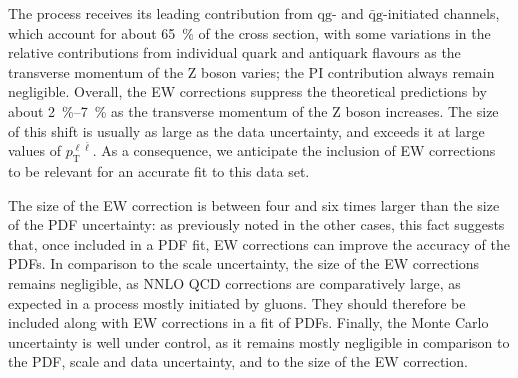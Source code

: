 The process receives its leading contribution from $\mathrm{qg}$- and
$\bar{\mathrm{q}}\mathrm{g}$-initiated channels, which account for about \SI{65}{\percent}
of the cross section, with some variations in the relative contributions from
individual quark and antiquark flavours as the transverse momentum of the
Z boson varies; the PI contribution always remain negligible.
Overall, the EW corrections suppress the theoretical predictions by about
\SIrange{2}{7}{\percent} as the transverse momentum of the Z boson increases.
The size of this shift is usually as large as the data uncertainty, and
exceeds it at large values of $p_\mathrm{T}^{\ell \bar{\ell}}$. As a consequence,
we anticipate the inclusion of EW corrections to be relevant for an accurate
fit to this data set.

The size of the EW correction is between four and six times larger than the
size of the PDF uncertainty: as previously noted in the other cases, this fact
suggests that, once included in a PDF fit, EW corrections can improve the
accuracy of the PDFs. In comparison to the scale uncertainty, the size of the
EW corrections remains negligible, as NNLO QCD corrections are comparatively
large, as expected in a process mostly initiated by gluons. They should
therefore be included along with EW corrections in a fit of PDFs. Finally, the
Monte Carlo uncertainty is well under control, as it remains mostly negligible
in comparison to the PDF, scale and data uncertainty, and to the size of the
EW correction.

